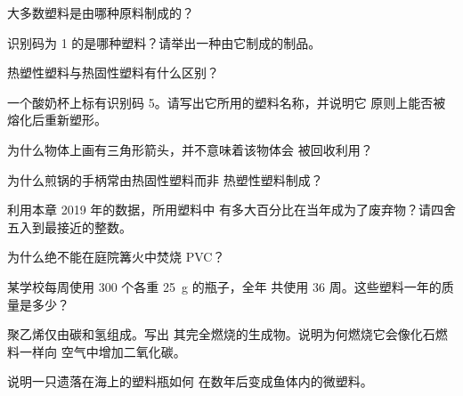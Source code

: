 \begin{exercise}[$\star$]\label{exo:g8:plastics:2}
大多数塑料是由哪种原料制成的？
\end{exercise}

\begin{exercise}[$\star$]\label{exo:g8:plastics:3}
识别码为 1 的是哪种塑料？请举出一种由它制成的制品。
\end{exercise}

\begin{exercise}[$\star$]\label{exo:g8:plastics:4}
热塑性塑料与热固性塑料有什么区别？
\end{exercise}

\begin{exercise}[$\star\star$]\label{exo:g8:plastics:5}
一个酸奶杯上标有识别码 5。请写出它所用的塑料名称，并说明它
原则上能否被熔化后重新塑形。
\end{exercise}

\begin{exercise}[$\star\star$]\label{exo:g8:plastics:6}
为什么物体上画有三角形箭头，并不意味着该物体会
被回收利用？
\end{exercise}

\begin{exercise}[$\star\star$]\label{exo:g8:plastics:7}
为什么煎锅的手柄常由热固性塑料而非
热塑性塑料制成？
\end{exercise}

\begin{exercise}[$\star\star$]\label{exo:g8:plastics:8}
利用本章 2019 年的数据，所用塑料中
有多大百分比在当年成为了废弃物？请四舍五入到最接近的整数。
\end{exercise}

\begin{exercise}[$\star\star$]\label{exo:g8:plastics:9}
为什么绝不能在庭院篝火中焚烧 PVC？
\end{exercise}

\begin{exercise}[$\star\star$]\label{exo:g8:plastics:10}
某学校每周使用 300 个各重 \qty{25}{g} 的瓶子，全年
共使用 36 周。这些塑料一年的质量是多少？
\end{exercise}

\begin{exercise}[$\star\star\star$]\label{exo:g8:plastics:11}
聚乙烯仅由碳和氢组成。写出
其完全燃烧的生成物。说明为何燃烧它会像化石燃料一样向
空气中增加二氧化碳。
\end{exercise}

\begin{exercise}[$\star\star\star$]\label{exo:g8:plastics:12}
说明一只遗落在海上的塑料瓶如何
在数年后变成鱼体内的微塑料。
\end{exercise}

